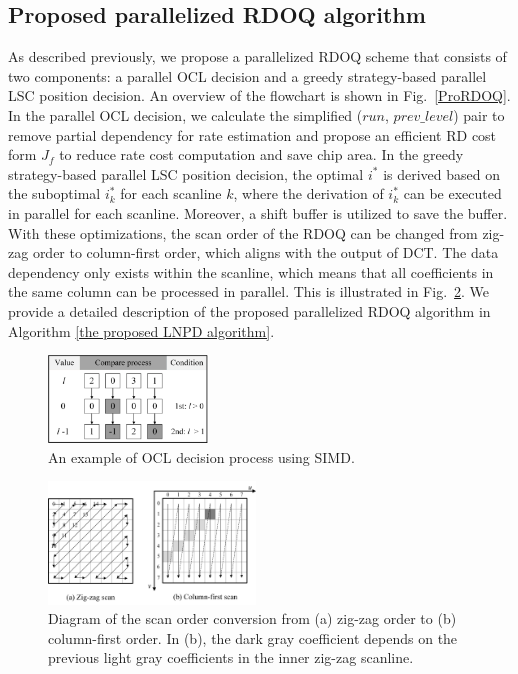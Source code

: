 \documentclass[lettersize,journal]{IEEEtran}
\begin{document}
\subsection{Proposed parallelized RDOQ algorithm}
\label{subsec:paraRDOQ}
As described previously, we propose a parallelized RDOQ scheme that consists of two components: a parallel OCL decision and a greedy strategy-based parallel LSC position decision. An overview of the flowchart is shown in Fig.~\ref{ProRDOQ}. In the parallel OCL decision, we calculate the simplified ($run$, $prev\_level$) pair to remove partial dependency for rate estimation and propose an efficient RD cost form $J_{f}$ to reduce rate cost computation and save chip area. In the greedy strategy-based parallel LSC position decision, the optimal $i^{*}$ is derived based on the suboptimal $i_{k}^{*}$ for each scanline $k$, where the derivation of $i_{k}^{*}$ can be executed in parallel for each scanline. Moreover, a shift buffer is utilized to save the buffer. With these optimizations, the scan order of the RDOQ can be changed from zig-zag order to column-first order, which aligns with the output of DCT. The data dependency only exists within the scanline, which means that all coefficients in the same column can be processed in parallel. This is illustrated in Fig.~\ref{zig2col}. We provide a detailed description of the proposed parallelized RDOQ algorithm in Algorithm \ref{the proposed LNPD algorithm}. 
\begin{figure}[!h]
	\centering
	\centerline{\includegraphics[width=0.38\textwidth]{figure/SIMDSEL.png}} 
	\caption{An example of OCL decision process using SIMD.}
	\label{selection} %
\end{figure} 

\begin{figure}[!h]
	\centering
	\centerline{\includegraphics[width=0.49\textwidth]{figure/zig2col.png}} 
	\caption{Diagram of the scan order conversion from (a) zig-zag order to (b) column-first order. In (b), the dark gray coefficient depends on the previous light gray coefficients in the inner zig-zag scanline.}
	\label{zig2col} %
\end{figure}
\end{document}
